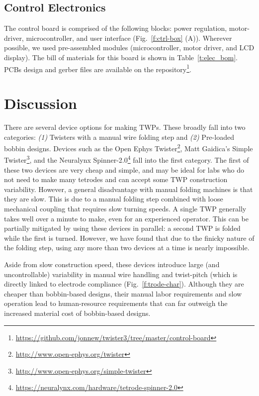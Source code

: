 \documentclass[11pt,a4paper]{article}
\begin{document}
\subsection{Control Electronics}
The control board is comprised of the following blocks: power regulation,
motor-driver, microcontroller, and user interface (Fig.~\ref{f:ctrl-box} (A)).
Wherever possible, we used pre-assembled modules (microcontroller, motor
driver, and LCD display). The bill of materials for this board is shown in
Table~\ref{t:elec_bom}. PCBs design and gerber files are available on the
repository\footnote{\url{https://github.com/jonnew/twister3/tree/master/control-board}}.

\section{Discussion}
There are several device options for making TWPs. These broadly fall into two
categories: \textit{(1)} Twisters with a manual wire folding step and
\textit{(2)} Pre-loaded bobbin designs. Devices such as the Open Ephys
Twister\footnote{\url{http://www.open-ephys.org/twister}}, Matt Gaidica's
Simple Twister\footnote{\url{http://www.open-ephys.org/simple-twister}}, and
the Neuralynx
Spinner-2.0\footnote{\url{https://neuralynx.com/hardware/tetrode-spinner-2.0}}
fall into the first category. The first of these two devices are very cheap and
simple, and may be ideal for labs who do not need to make many tetrodes and can
accept some TWP construction variability. However, a general disadvantage with manual
folding machines is that they are slow. This is due to a  manual folding step
combined with loose mechanical coupling that requires slow turning speeds.  A
single TWP generally takes well over a minute to make, even for an experienced
operator. This can be partially mitigated by using these devices in
parallel: a second TWP is folded while the first is turned. However, we have
found that due to the finicky nature of the folding step, using any more than
two devices at a time is nearly impossible.

Aside from slow construction speed, these devices introduce large (and
uncontrollable) variability in manual wire handling and twist-pitch (which is
directly linked to electrode compliance (Fig.~\ref{f:trode-char}). Although
they are cheaper than bobbin-based designs, their manual labor requirements and
slow operation lead to human-resource requirements that can far outweigh the
increased material cost of bobbin-based designs.
\end{document}
